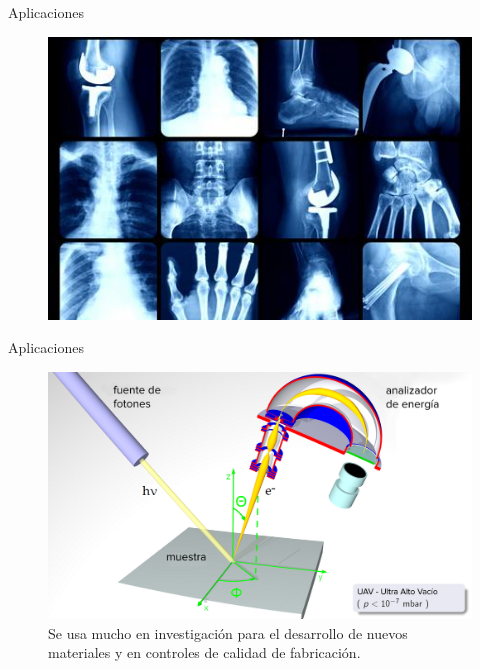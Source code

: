 \documentclass{beamer}
\begin{document}
\begin{darkframes}
\begin{frame}{Aplicaciones}
\begin{multicols}{2}
    \newpage
    \begin{figure}
        \centering
        \includegraphics[width = 1.05 \linewidth]{resources/17f.jpg}
    \end{figure}
    
    \end{multicols}
    \end{frame}
    
    \begin{frame}{Aplicaciones}
    \begin{figure}
        \centering
        \includegraphics[width = 0.9 \linewidth]{resources/18f.png}
        \caption{Se usa mucho en investigaci\'on para el desarrollo de nuevos materiales y en controles de calidad de fabricaci\'on.}
        \label{fig:my_label}
    \end{figure}
    

\end{frame}
\end{darkframes}
\end{document}

